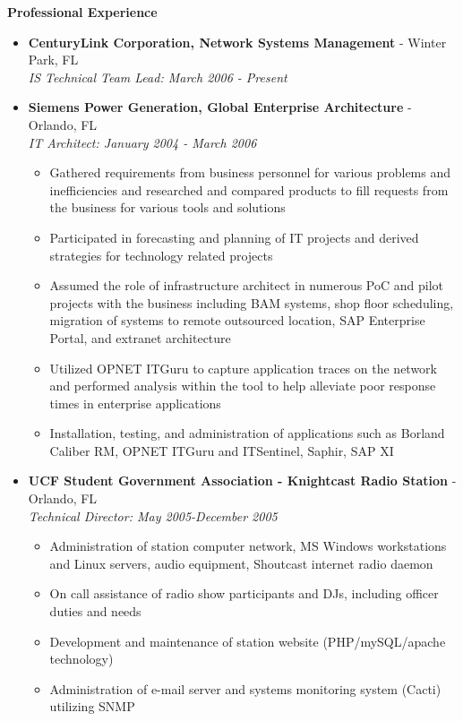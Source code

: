 \documentclass[10pt,oneside]{article}
\newenvironment{ressection}[1]{
	\vspace{4pt}
	\textbf{\selectfont\normalsize#1}
	\begin{itemize}
	\vspace{3pt}
}{
	\end{itemize}
}
\newcommand{\ressubitem}[1]{
	\vspace{-1pt}
	\item \begin{flushleft} #1 \end{flushleft}
}
\newcommand{\resbigitem}[3]{
	\vspace{-5pt}
	\item
	\textbf{#1} - #2 \\
	\textit{#3}
}
\newenvironment{ressubsec}[3]{
	\resbigitem{#1}{#2}{#3}
	\vspace{-2pt}
	\begin{itemize}
}{
	\end{itemize}
}
\begin{document}
\begin{ressection}{Professional Experience}
\begin{ressubsec}{CenturyLink Corporation, Network Systems Management}{Winter Park, FL}{IS Technical Team Lead: March 2006 - Present}
	\end{ressubsec}

	\begin{ressubsec}{Siemens Power Generation, Global Enterprise Architecture}{Orlando, FL}{IT Architect: January 2004 - March 2006}
		\ressubitem{Gathered requirements from business personnel for various problems and inefficiencies and researched and compared products to fill requests from the business for various tools and solutions}
		\ressubitem{Participated in forecasting and planning of IT projects and derived strategies for technology related projects}
		\ressubitem{Assumed the role of infrastructure architect in numerous PoC and pilot projects with the business including BAM systems, shop floor scheduling, migration of systems to remote outsourced location, SAP Enterprise Portal, and extranet architecture}
		\ressubitem{Utilized OPNET ITGuru to capture application traces on the network and performed analysis within the tool to help alleviate poor response times in enterprise applications}
		\ressubitem{Installation, testing, and administration of applications such as Borland Caliber RM, OPNET ITGuru and ITSentinel, Saphir, SAP XI}
	\end{ressubsec}

	\begin{ressubsec}{UCF Student Government Association - Knightcast Radio Station}{Orlando, FL}{Technical Director: May 2005-December 2005}
		\ressubitem{Administration of station computer network, MS Windows workstations and Linux servers, audio equipment, Shoutcast internet radio daemon}
		\ressubitem{On call assistance of radio show participants and DJs, including officer duties and needs}
		\ressubitem{Development and maintenance of station website (PHP/mySQL/apache technology)}
		\ressubitem{Administration of e-mail server and systems monitoring system (Cacti) utilizing SNMP}
	\end{ressubsec}

\end{ressection}

\end{document}
